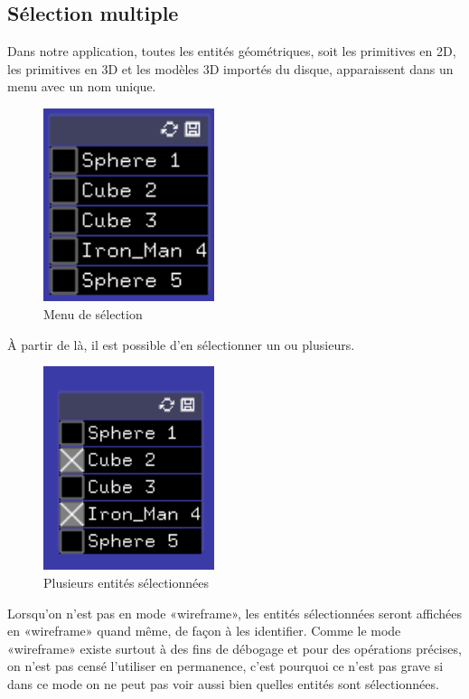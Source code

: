 \newpage

\subsection{Sélection multiple}

Dans notre application, toutes les entités géométriques, soit les primitives en 2D, les primitives en 3D et les modèles 3D importés du disque, apparaissent dans un menu avec un nom unique.

\begin{figure}[h]
	\centering
	\includegraphics[width=5cm]{fig/menuSelection.png}
	\caption{Menu de sélection}
	\label{fig:menuSelection}
\end{figure}

À partir de là, il est possible d'en sélectionner un ou plusieurs.

\begin{figure}[h]
	\centering
	\includegraphics[width=5cm]{fig/menuSelectionPlusieurs.png}
	\caption{Plusieurs entités sélectionnées}
	\label{fig:selectionMultiple}
\end{figure}

\newpage

Lorsqu'on n'est pas en mode «wireframe», les entités sélectionnées seront affichées en «wireframe» quand même, de façon à les identifier. Comme le mode «wireframe» existe surtout à des fins de débogage et pour des opérations précises, on n'est pas censé l'utiliser en permanence, c'est pourquoi ce n'est pas grave si dans ce mode on ne peut pas voir aussi bien quelles entités sont sélectionnées.

